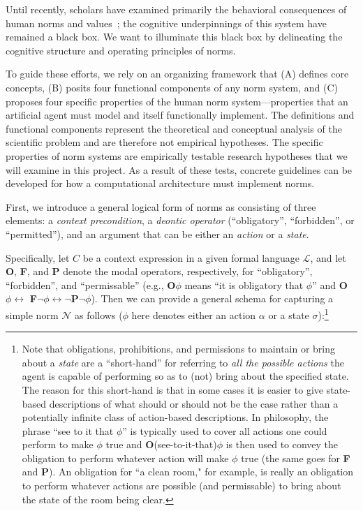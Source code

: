 \documentclass[12pt]{article}
\begin{document}
\vskip 0.1in
\vskip 0.1in

\noindent Until recently, scholars have examined primarily the
behavioral consequences of human norms and values~\citep{schwartz92, cialdini91}; the
cognitive underpinnings of this system have remained a black
box.  We want to illuminate this black box by delineating the
cognitive structure and operating principles of norms.

To guide these efforts, we rely on an organizing framework that (A)
defines core concepts, (B) posits four functional components of any
norm system, and (C) proposes four specific properties of the human
norm system---properties that an artificial agent must model and
itself functionally implement. The definitions and functional
components represent the theoretical and conceptual analysis of the
scientific problem and are therefore not empirical hypotheses. The
specific properties of norm systems are empirically testable research
hypotheses that we will examine in this project.  As a result of these
tests, concrete guidelines can be developed for how a computational
architecture must implement norms.

\newpage
{}
\label{sec:core}
\vskip 0.1in

\noindent First, we introduce a general logical form of  norms as
consisting of three elements: a {\em context precondition}, a {\em
  deontic operator} (``obligatory'', ``forbidden'', or ``permitted''),
and an argument that can be either an {\em action} or a {\em state}.

Specifically, let $C$ be a context expression in a given formal
language $\mathcal{L}$, and let {\bf O}, {\bf F}, and {\bf P} denote
the modal operators, respectively, for ``obligatory'', ``forbidden'',
and ``permissable'' (e.g., {\bf O}$\phi$ means ``it is obligatory that
$\phi$'' and {\bf O}$\phi \leftrightarrow${\bf
  F}$\neg\phi \leftrightarrow\neg${\bf P}$\neg\phi$).  Then we can provide
a general schema for capturing a simple norm $\mathcal{N}$ as follows ($\phi$ here
denotes either an action $\alpha$ or a state $\sigma$):\footnote{Note
  that obligations, prohibitions, and permissions to maintain or bring
  about a {\em state} are a ``short-hand'' for referring to {\em all the
    possible actions} the agent is capable of performing so as to (not) 
    bring about the specified state.  The reason for
  this short-hand is that in some cases it is easier to give
  state-based descriptions of what should or should not be the case
  rather than a potentially infinite class of action-based descriptions.  In
  philosophy, the phrase ``see to it that $\phi$'' is typically used to
  cover all actions one could perform to make $\phi$ true and {\bf
    O}(see-to-it-that)$\phi$ is then used to convey the obligation to
  perform whatever action will make $\phi$ true (the same goes for
  {\bf F} and {\bf P}).  An obligation for ``a clean room," for example, is really
  an obligation to perform whatever actions are possible (and permissable)
  to bring about the state of the room being clear.  }
  
\end{document}

